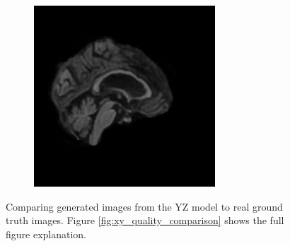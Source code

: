 \documentclass[12pt, fleqn, titlepage]{article}
\newcommand\skipperer{0.45pt}
\newcommand{\1}[1]{\mathds{1}\left[#1\right]}
\begin{document}
\begin{figure}[H]
\begin{subfigure}[b]{0.7\textwidth}
		\hskip\skipperer
		\includegraphics[width=0.22\linewidth]{imgs/082_S_0469/ALL_model_082_S_0469_yz_3}
	\end{subfigure}
	\caption{Comparing generated images from the YZ model to real ground truth images. Figure \ref{fig:xy_quality_comparison} shows the full figure explanation.}
	\label{fig:all_quality_comparison}
\end{figure}


\vspace*{-1cm} %
\end{document}
